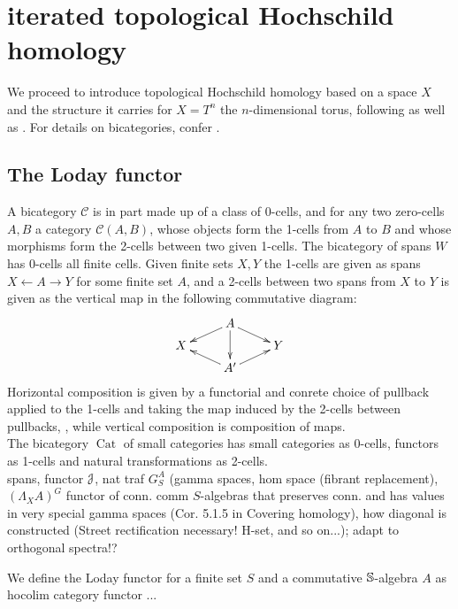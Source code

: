 \section{iterated topological Hochschild homology}
We proceed to introduce topological Hochschild homology based on a space $X$ and the structure it carries for $X = T^n$ the $n$-dimensional torus, following \cite{brun2010covering} as well as \cite{carlsson2011higher}. For details on bicategories, confer \cite{benabou1967introduction} .
\subsection{The Loday functor}
A bicategory $\mathcal{C}$ is in part made up of a class of 0-cells, and for any two zero-cells $A,B$ a category $\mathcal{C}(A,B)$, whose objects form the 1-cells from $A$ to $B$ and whose morphisms form the 2-cells between two given 1-cells. The bicategory of spans $W$ has 0-cells all finite cells. Given finite sets $X,Y$ the 1-cells are given as spans $ X \leftarrow A \rightarrow Y$ for some finite set $A$, and a 2-cells between two spans from $X$ to $Y$  is given as the vertical map in the following commutative diagram:
\[
\xymatrix@R-=.5em{
  &
  A \ar[dl] \ar[dd] \ar[dr]
  \\
  X
  &
  &
  Y
  \\
  &
  A^\prime \ar[ul] \ar[ur]
  &
}
\]
Horizontal composition is given by a functorial and conrete choice of pullback applied to the 1-cells and taking the map induced by the 2-cells between pullbacks, , while vertical composition is composition of maps.\\
The bicategory $\operatorname{Cat}$ of small categories has small categories as 0-cells, functors as 1-cells and natural transformations as 2-cells.
\\
spans, functor $\mathcal{J}$, nat traf $G^A_S$ (gamma spaces, hom space (fibrant replacement), $(\Lambda_X A)^G$ functor of conn. comm $S$-algebras that preserves conn. and has values in very special gamma spaces (Cor. 5.1.5 in Covering homology), how diagonal is constructed (Street rectification necessary! H-set, and so on...); adapt to orthogonal spectra!?
\begin{defn}\label{def_loday_functor}
We define the Loday functor for a finite set $S$ and a commutative $\mathbb{S}$-algebra $A$ as hocolim category functor ...
\end{defn}
